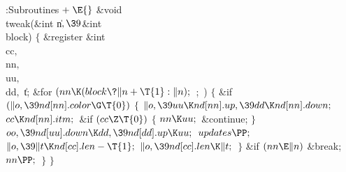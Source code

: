 \Y\B\4:Subroutines\X${}\mathrel+\E{}$\6
\1\1\&{void} \\{tweak}(\&{int} \|n${},\39{}$\&{int} \\{block})\2\2\6
${}\{{}$\1\6
\&{register} \&{int} \\{cc}${},{}$ \\{nn}${},{}$ \\{uu}${},{}$ \\{dd}${},{}$ %
\|t;\7
\&{for} ${}(\\{nn}\K(\\{block}\?\|n+\T{1}:\|n);{}$  ; \,)\5
${}\{{}$\1\6
\&{if} ${}(\|o,\39\\{nd}[\\{nn}].\\{color}\G\T{0}){}$\5
${}\{{}$\1\6
${}\|o,\39\\{uu}\K\\{nd}[\\{nn}].\\{up},\39\\{dd}\K\\{nd}[\\{nn}].\\{down};{}$\6
${}\\{cc}\K\\{nd}[\\{nn}].\\{itm};{}$\6
\&{if} ${}(\\{cc}\Z\T{0}){}$\5
${}\{{}$\1\6
${}\\{nn}\K\\{uu};{}$\6
\&{continue};\6
\4${}\}{}$\2\6
${}\\{oo},\39\\{nd}[\\{uu}].\\{down}\K\\{dd},\39\\{nd}[\\{dd}].\\{up}\K%
\\{uu};{}$\6
${}\\{updates}\PP;{}$\6
${}\|o,\39\|t\K\\{nd}[\\{cc}].\\{len}-\T{1};{}$\6
${}\|o,\39\\{nd}[\\{cc}].\\{len}\K\|t;{}$\6
\4${}\}{}$\2\6
\&{if} ${}(\\{nn}\E\|n){}$\1\5
\&{break};\2\6
${}\\{nn}\PP;{}$\6
\4${}\}{}$\2\6
\4${}\}{}$\2\par
\fi

